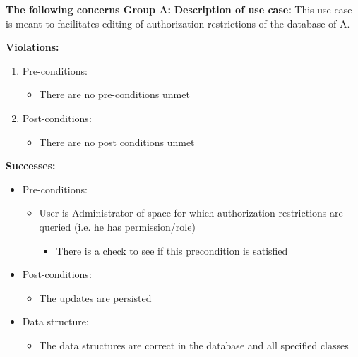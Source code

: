 \textbf{The following concerns Group A:}\newline
\textbf{Description of use case:}\newline
This use case is meant to facilitates editing of authorization restrictions of the database of A.
\medskip

\textbf{Violations:}
\begin{enumerate}

	\item Pre-conditions:
	\begin{itemize}
		\item There are no pre-conditions unmet
	\end{itemize}
	
	\item Post-conditions:
	\begin{itemize}
		\item There are no post conditions unmet
	\end{itemize}
		
\end{enumerate}

\textbf{Successes:}
\begin{itemize}

	
\item Pre-conditions:
	\begin{itemize}
		\item User is Administrator of space for which authorization restrictions are queried (i.e. he has permission/role)
			\begin{itemize}
					\item There is a check to see if this precondition is satisfied
			\end{itemize}
	\end{itemize}
		
	\item Post-conditions:
		\begin{itemize}
			\item The updates are persisted
		\end{itemize}
		
	\item Data structure:
		\begin{itemize}
			\item The data structures are correct in the database and all specified classes
		\end{itemize}
\end{itemize}

\noindent
\medskip

